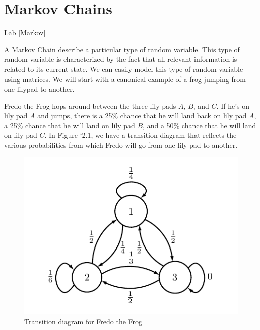 \label{Ch:Markov}


\section*{Markov Chains}

Lab \ref{Markov}

A Markov Chain describe a particular type of random variable. This type of random variable is characterized by the fact that all relevant information is related to its current state. We can easily model this type of random variable using matrices. We will start with a canonical example of a frog jumping from one lilypad to another.

Fredo the Frog hops around between the three lily pads $A$, $B$, and $C$.  If he's on lily pad $A$ and jumps, there is a 25\% chance that he will land back on lily pad $A$, a 25\% chance that he will land on lily pad $B$, and a 50\% chance that he will land on lily pad $C$.  In Figure `2.1, we have a transition diagram that reflects the various probabilities from which Fredo will go from one lily pad to another.

\begin{figure}[h!]
\label{markov1_fig1}
\begin{center}
\includegraphics[scale = 1]{./Figures/markov1}
\end{center}
\caption{Transition diagram for Fredo the Frog}
\end{figure}


